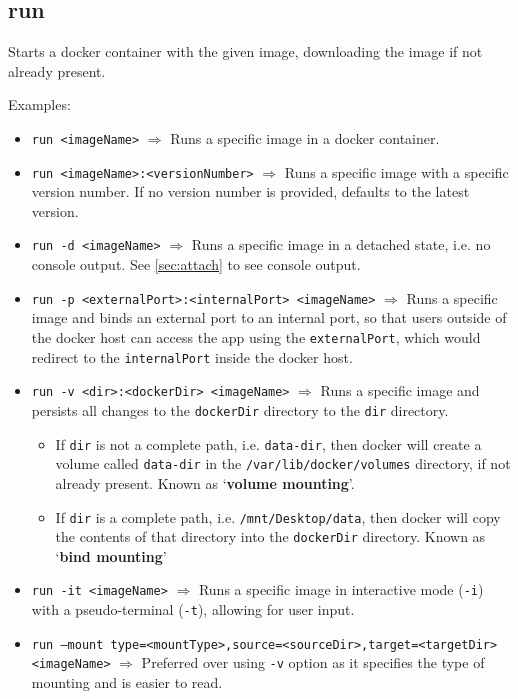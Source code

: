 \documentclass[a4paper, 12pt]{article}
\begin{document}
\subsection{run}

Starts a docker container with the given image, downloading the image if not
already present.

\vspace{0.5em}
Examples:
\begin{itemize}
	\item \texttt{run <imageName>} $\Rightarrow$ Runs a specific image
	in a docker container.
	\item \texttt{run <imageName>:<versionNumber>} $\Rightarrow$ Runs a specific
	image with a specific version number. If no version number is provided,
	defaults to the latest version.
	\item \texttt{run -d <imageName>} $\Rightarrow$ Runs a specific image in a
	detached state, i.e. no console output. See \ref{sec:attach} to see console
	output.
	\item \texttt{run -p <externalPort>:<internalPort> <imageName>}
	$\Rightarrow$ Runs a specific image and binds an external port to an
	internal port, so that users outside of the docker host can access the app
	using the \texttt{externalPort}, which would redirect to the
	\texttt{internalPort} inside the docker host.
	\item \texttt{run -v <dir>:<dockerDir> <imageName>} $\Rightarrow$ Runs
	a specific image and persists all changes to the \texttt{dockerDir}
	directory to the \texttt{dir} directory.
	\begin{itemize}
		\item If \texttt{dir} is not a complete path, i.e. \texttt{data-dir},
		then docker will create a volume called \texttt{data-dir} in the
		\texttt{/var/lib/docker/volumes} directory, if not already present. Known
		as `\textbf{volume mounting}'.
		\item If \texttt{dir} is a complete path, i.e. \texttt{/mnt/Desktop/data},
		then docker will copy the contents of that directory into the
		\texttt{dockerDir} directory. Known as `\textbf{bind mounting}'
	\end{itemize}
	\item \texttt{run -it <imageName>} $\Rightarrow$ Runs a specific image in
	interactive mode (\texttt{-i}) with a pseudo-terminal (\texttt{-t}),
	allowing for user input.
	\item \texttt{run --mount type=<mountType>,source=<sourceDir>,target=<targetDir>
	<imageName>} $\Rightarrow$ Preferred over using \texttt{-v} option as it
	specifies the type of mounting and is easier to read.
\end{itemize}
\end{document}
